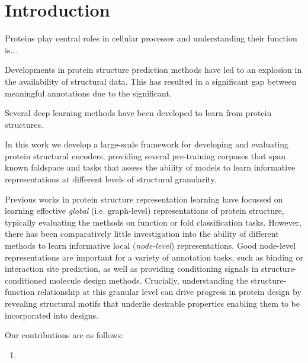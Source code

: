 \section{Introduction}
Proteins play central roles in cellular processes and understanding their function is...


Developments in protein structure prediction methods have led to an explosion in the availability of structural data. This has resulted in a significant gap between meaningful annotations due to the significant. 


Several deep learning methods have been developed to learn from protein structures. 


In this work we develop a large-scale framework for developing and evaluating protein structural encoders, providing several pre-training corpuses that span known foldspace and tasks that assess the ability of models to learn informative representations at different levels of structural granularity.

Previous works in protein structure representation learning have focussed on learning effective \emph{global} (i.e. graph-level) representations of protein structure, typically evaluating the methods on function or fold classification tasks. However, there has been comparatively little investigation into the ability of different methods to learn informative local (\emph{node-level}) representations. Good node-level representations are important for a variety of annotation tasks, such as binding or interaction site prediction, as well as providing conditioning signals in structure-conditioned molecule design methods. Crucially, understanding the structure-function relationship at this granular level can drive progress in protein design by revealing structural motifs that underlie desirable properties enabling them to be incorporated into designs.



Our contributions are as follows:

\begin{enumerate}
    \item 
\end{enumerate}